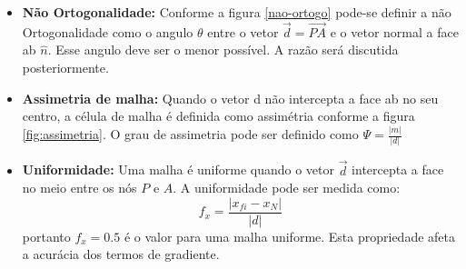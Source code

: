 \begin{itemize}
    \item \textbf{Não Ortogonalidade:} Conforme a figura \ref{nao-ortogo} pode-se definir a não Ortogonalidade como o angulo $\theta$ entre o vetor $\vec{d}=\vec{PA}$ e o vetor normal a face ab $\hat{n}$. Esse angulo deve ser o menor possível. A razão será discutida posteriormente.
    \item \textbf{Assimetria de malha:} Quando o vetor d não intercepta a face ab no seu centro, a célula de malha é definida como assimétria conforme a figura \ref{fig:assimetria}. O grau de assimetria pode ser definido como $\Psi = \frac{|m|}{|d|}$
    \item \textbf{Uniformidade:}  Uma malha é uniforme quando o vetor $\vec{d}$ intercepta a face no meio entre os nós $P$ e $A$. A uniformidade pode ser medida como:
    \begin{equation*}
        f_x = \frac{|x_{fi}-x_N|}{|d|}
    \end{equation*}
    portanto $f_x=0.5$ é o valor para uma malha uniforme. Esta propriedade afeta a acurácia dos termos de gradiente.
\end{itemize}

